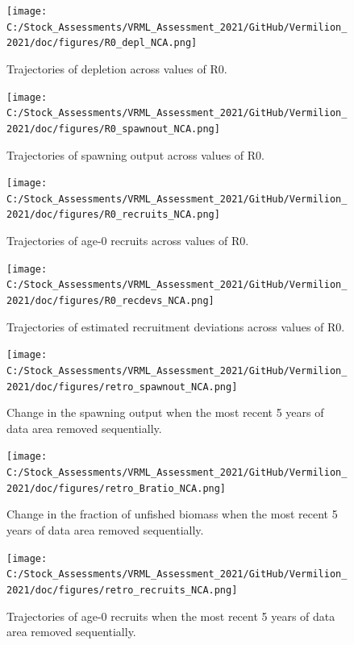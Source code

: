 \documentclass[
  english,
  a4paper,
]{article}
\begin{document}
\begin{figure}
\centering
\texttt{[image: C:/Stock\_Assessments/VRML\_Assessment\_2021/GitHub/Vermilion\_2021/doc/figures/R0\_depl\_NCA.png]}
\caption{Trajectories of depletion across values of R0.\label{fig:r0-depl}}
\end{figure}

\begin{figure}
\centering
\texttt{[image: C:/Stock\_Assessments/VRML\_Assessment\_2021/GitHub/Vermilion\_2021/doc/figures/R0\_spawnout\_NCA.png]}
\caption{Trajectories of spawning output across values of R0.\label{fig:r0-spawn}}
\end{figure}

\begin{figure}
\centering
\texttt{[image: C:/Stock\_Assessments/VRML\_Assessment\_2021/GitHub/Vermilion\_2021/doc/figures/R0\_recruits\_NCA.png]}
\caption{Trajectories of age-0 recruits across values of R0.\label{fig:r0-recruits}}
\end{figure}

\begin{figure}
\centering
\texttt{[image: C:/Stock\_Assessments/VRML\_Assessment\_2021/GitHub/Vermilion\_2021/doc/figures/R0\_recdevs\_NCA.png]}
\caption{Trajectories of estimated recruitment deviations across values of R0.\label{fig:r0-recdevs}}
\end{figure}

\begin{figure}
\centering
\texttt{[image: C:/Stock\_Assessments/VRML\_Assessment\_2021/GitHub/Vermilion\_2021/doc/figures/retro\_spawnout\_NCA.png]}
\caption{Change in the spawning output when the most recent 5 years of data area removed sequentially.\label{fig:retro-spawnb}}
\end{figure}

\begin{figure}
\centering
\texttt{[image: C:/Stock\_Assessments/VRML\_Assessment\_2021/GitHub/Vermilion\_2021/doc/figures/retro\_Bratio\_NCA.png]}
\caption{Change in the fraction of unfished biomass when the most recent 5 years of data area removed sequentially.\label{fig:retro-bratio}}
\end{figure}

\begin{figure}
\centering
\texttt{[image: C:/Stock\_Assessments/VRML\_Assessment\_2021/GitHub/Vermilion\_2021/doc/figures/retro\_recruits\_NCA.png]}
\caption{Trajectories of age-0 recruits when the most recent 5 years of data area removed sequentially.\label{fig:retro-recruits}}
\end{figure}
\end{document}
